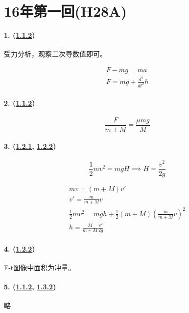 
\section{16年第一回(H28A)}

\paragraph{1. (\hyperref[subsec:1.1.2]{1.1.2})} 受力分析，观察二次导数值即可。

\begin{gather*}
    F-mg=ma\\
    F=mg+\frac{d^2}{dt^2}h
\end{gather*}

\paragraph{2. (\hyperref[subsec:1.1.2]{1.1.2})}

\begin{equation*}
    \frac{F}{m+M}=\frac{\mu mg}{M}
\end{equation*}

\paragraph{3. (\hyperref[subsec:1.2.1]{1.2.1}, \hyperref[subsec:1.2.2]{1.2.2})}

\begin{equation*}
    \frac12mv^2=mgH\implies
    H=\frac{v^2}{2g}
\end{equation*}

\begin{gather*}
    mv=(m+M)v'\\
    v'=\frac{m}{m+M}v\\
    \frac12mv^2=mgh+\frac12(m+M)\left(\frac{m}{m+M}v\right)^2\\
    h=\frac{M}{m+M}\frac{v^2}{2g}
\end{gather*}

\paragraph{4. (\hyperref[subsec:1.2.2]{1.2.2})} F-t图像中面积为冲量。
\paragraph{5. (\hyperref[subsec:1.1.2]{1.1.2}, \hyperref[subsec:1.3.2]{1.3.2})} 略
